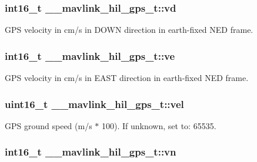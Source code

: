 \hypertarget{struct____mavlink__hil__gps__t_a3d764d688357582b0aba5da4992579b5}{
\subsubsection[{vd}]{\setlength{\rightskip}{0pt plus 5cm}int16\+\_\+t \+\_\+\+\_\+mavlink\+\_\+hil\+\_\+gps\+\_\+t\+::vd}}\label{struct____mavlink__hil__gps__t_a3d764d688357582b0aba5da4992579b5}


G\+P\+S velocity in cm/s in D\+O\+W\+N direction in earth-\/fixed N\+E\+D frame. 

\hypertarget{struct____mavlink__hil__gps__t_a7c3f8d60cff9df9d2d03b3ac84bbfb15}{
\subsubsection[{ve}]{\setlength{\rightskip}{0pt plus 5cm}int16\+\_\+t \+\_\+\+\_\+mavlink\+\_\+hil\+\_\+gps\+\_\+t\+::ve}}\label{struct____mavlink__hil__gps__t_a7c3f8d60cff9df9d2d03b3ac84bbfb15}


G\+P\+S velocity in cm/s in E\+A\+S\+T direction in earth-\/fixed N\+E\+D frame. 

\hypertarget{struct____mavlink__hil__gps__t_ac586576e58891b09ca979d421465ac81}{
\subsubsection[{vel}]{\setlength{\rightskip}{0pt plus 5cm}uint16\+\_\+t \+\_\+\+\_\+mavlink\+\_\+hil\+\_\+gps\+\_\+t\+::vel}}\label{struct____mavlink__hil__gps__t_ac586576e58891b09ca979d421465ac81}


G\+P\+S ground speed (m/s $\ast$ 100). If unknown, set to\+: 65535. 

\hypertarget{struct____mavlink__hil__gps__t_aff2b255f76bb2f80ccc690d70c11195b}{
\subsubsection[{vn}]{\setlength{\rightskip}{0pt plus 5cm}int16\+\_\+t \+\_\+\+\_\+mavlink\+\_\+hil\+\_\+gps\+\_\+t\+::vn}}\label{struct____mavlink__hil__gps__t_aff2b255f76bb2f80ccc690d70c11195b}


